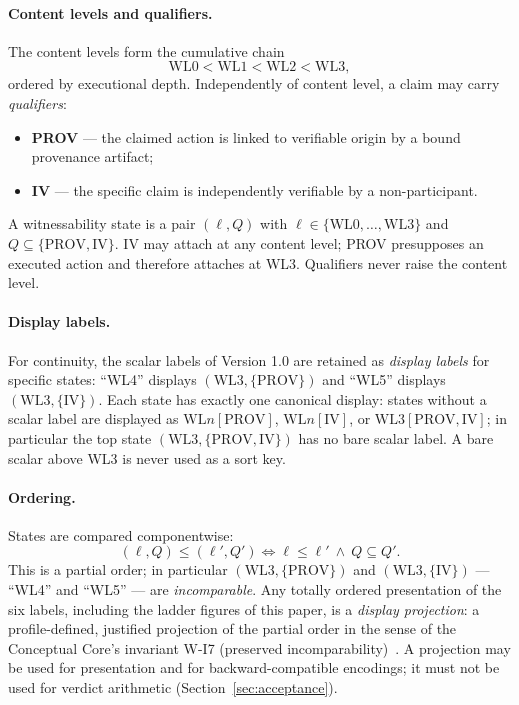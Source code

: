 \documentclass[11pt]{article}
\begin{document}
\paragraph{Content levels and qualifiers.} The content levels form the cumulative chain
\[
\mathrm{WL0} < \mathrm{WL1} < \mathrm{WL2} < \mathrm{WL3},
\]
ordered by executional depth. Independently of content level, a claim may carry \emph{qualifiers}:
\begin{itemize}[leftmargin=*]
\item \textbf{PROV} --- the claimed action is linked to verifiable origin by a bound provenance artifact;
\item \textbf{IV} --- the specific claim is independently verifiable by a non-participant.
\end{itemize}
A witnessability state is a pair $(\ell, Q)$ with $\ell \in \{\mathrm{WL0},\ldots,\mathrm{WL3}\}$ and $Q \subseteq \{\mathrm{PROV}, \mathrm{IV}\}$. IV may attach at any content level; PROV presupposes an executed action and therefore attaches at WL3. Qualifiers never raise the content level.

\paragraph{Display labels.} For continuity, the scalar labels of Version 1.0 are retained as \emph{display labels} for specific states: ``WL4'' displays $(\mathrm{WL3}, \{\mathrm{PROV}\})$ and ``WL5'' displays $(\mathrm{WL3}, \{\mathrm{IV}\})$. Each state has exactly one canonical display: states without a scalar label are displayed as $\mathrm{WL}n[\mathrm{PROV}]$, $\mathrm{WL}n[\mathrm{IV}]$, or $\mathrm{WL3}[\mathrm{PROV},\mathrm{IV}]$; in particular the top state $(\mathrm{WL3},\{\mathrm{PROV},\mathrm{IV}\})$ has no bare scalar label. A bare scalar above WL3 is never used as a sort key.

\paragraph{Ordering.} States are compared componentwise:
\[
(\ell, Q) \le (\ell', Q') \iff \ell \le \ell' \ \wedge\ Q \subseteq Q'.
\]
This is a partial order; in particular $(\mathrm{WL3},\{\mathrm{PROV}\})$ and $(\mathrm{WL3},\{\mathrm{IV}\})$ --- ``WL4'' and ``WL5'' --- are \emph{incomparable}. Any totally ordered presentation of the six labels, including the ladder figures of this paper, is a \emph{display projection}: a profile-defined, justified projection of the partial order in the sense of the Conceptual Core's invariant W-I7 (preserved incomparability)~\cite{wcc_core_2026}. A projection may be used for presentation and for backward-compatible encodings; it must not be used for verdict arithmetic (Section~\ref{sec:acceptance}).
\end{document}
